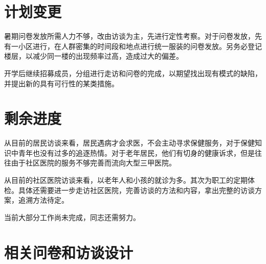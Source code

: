 \documentclass{article}
\begin{document}
    \section{计划变更}
    暑期问卷发放所需人力不够，改由访谈为主，先进行定性考察。对于问卷发放，先有一小区进行，在人群密集的时间段和地点进行统一服装的问卷发放。另务必登记楼层，以减少同一楼的出现频率过高，造成过大的偏差。
    
    开学后继续招募成员，分组进行走访和问卷的完成，以期望找出现有模式的缺陷，并提出新的具有可行性的某类措施。
    \section{剩余进度}
    从目前的居民访谈来看，居民遇病才会求医，不会主动寻求保健服务，对于保健知识中青年也没有过多的追逐热情。对于老年居民，他们有切身的健康诉求，但是往往由于社区医院的服务不够完善而流向大型三甲医院。
    
    从目前的社区医院访谈来看，以老年人和小孩的就诊为多。其次为职工的定期体检。具体还需要进一步走访社区医院，完善访谈的方法和内容，拿出完整的访谈方案，追溯方法待定。
    
    当前大部分工作尚未完成，同志还需努力。
    \clearpage
    
    \section{相关问卷和访谈设计}
    
    
    \clearpage
    \begin{spacing}{0.9}
        
\end{spacing}
\end{document}
